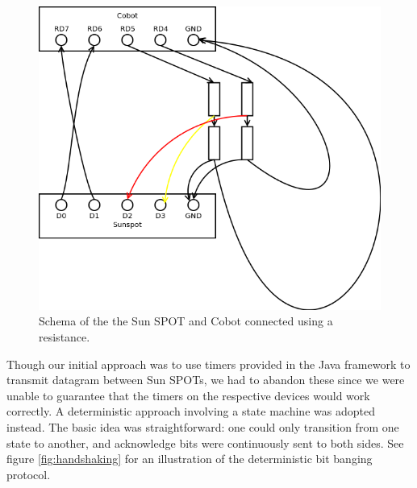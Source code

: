 \documentclass[a4paper,10pt]{article} %
\begin{document}
\begin{figure}[H]
\label{fig:connection-schema}
\centering
\includegraphics[scale=0.5]{img/connection-schema.png}
\caption{Schema of the the Sun SPOT and Cobot connected using a resistance.}
\end{figure}

Though our initial approach was to use timers provided in the Java framework to
transmit datagram between Sun SPOTs, we had to abandon these since we were
unable to guarantee that the timers on the respective devices would work
correctly. A deterministic approach involving a state machine was adopted
instead. The basic idea was straightforward: one could only transition from one
state to another, and acknowledge bits were continuously sent to both sides. See
figure \ref{fig:handshaking} for an illustration of the deterministic bit
banging protocol.
\end{document}
